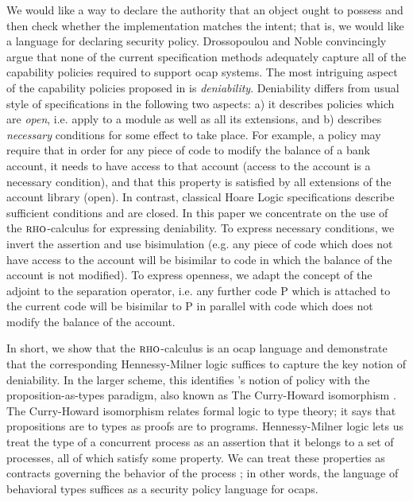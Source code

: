 \documentclass[submission,copyright,creativecommons]{eptcs}
\numberwithin{equation}{subsection}
\newcommand{\rhoc}{${\textsc{rho}}$-calculus}
\begin{document}
We would like a way to declare the authority that an object ought to
possess and then check whether the implementation matches the intent;
that is, we would like a language for declaring security policy.
Drossopoulou and Noble \cite{Drossopoulou:2013:NCP:2489804.2489811}
convincingly argue that none of the current specification methods
adequately capture all of the capability policies required to support
ocap systems. The most intriguing aspect of the capability policies
proposed in \cite{Drossopoulou:2013:NCP:2489804.2489811} is {\em
  deniability}. Deniability differs from usual style of specifications
in the following two aspects: a) it describes policies which are {\em
  open}, i.e. apply to a module as well as all its extensions, and b)
describes {\em necessary} conditions for some effect to take
place. For example, a policy may require that in order for any piece
of code to modify the balance of a bank account, it needs to have
access to that account (access to the account is a necessary
condition), and that this property is satisfied by all extensions of
the account library (open). In contrast, classical Hoare Logic
specifications \cite{Hoare:1969:ABC:363235.363259} describe sufficient
conditions and are closed.  In this paper we concentrate on the use of
the {\rhoc} \cite{DBLP:conf/tgc/MeredithR05} for expressing
deniability. To express necessary conditions, we invert the assertion
and use bisimulation (e.g. any piece of code which does not have
access to the account will be bisimilar to code in which the balance
of the account is not modified). To express openness, we adapt the
concept of the adjoint to the separation operator, i.e. any further
code P which is attached to the current code will be bisimilar to P in
parallel with code which does not modify the balance of the account.

In short, we show that the \rhoc\; is an ocap language and demonstrate
that the corresponding Hennessy-Milner logic suffices to capture the
key notion of deniability. In the larger scheme, this identifies
\cite{Drossopoulou:2013:NCP:2489804.2489811}'s notion of policy with
the proposition-as-types paradigm, also known as The Curry-Howard
isomorphism \cite{Abramsky:1992:PP:194588.194591}. The Curry-Howard isomorphism
relates formal logic to type theory; it says that propositions are to
types as proofs are to programs.  Hennessy-Milner logic lets us treat
the type of a concurrent process as an assertion that it belongs to a
set of processes, all of which satisfy some property.  We can treat
these properties as contracts governing the behavior of the process
\cite{Meredith:2003:CT:944217.944236}; in other words, the language of
behavioral types suffices as a security policy language for ocaps.
\end{document}
